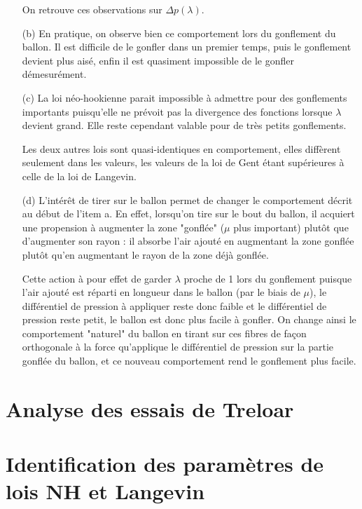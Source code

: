 \documentclass[a4paper,11pt]{article}
\begin{document}
\begin{enumerate}
On retrouve ces observations sur $\Delta p (\lambda)$.

\item[(b)]
En pratique, on observe bien ce comportement lors du gonflement du ballon. Il est difficile de le gonfler dans un premier temps, puis le gonflement devient plus aisé, enfin il est quasiment impossible de le gonfler démesurément.

\item[(c)]
La loi néo-hookienne parait impossible à admettre pour des gonflements importants puisqu'elle ne prévoit pas la divergence des fonctions lorsque $\lambda$ devient grand. Elle reste cependant valable pour de très petits gonflements.

\hspace{0.8cm}Les deux autres lois sont quasi-identiques en comportement, elles diffèrent seulement dans les valeurs, les valeurs de la loi de Gent étant supérieures à celle de la loi de Langevin.

\item[(d)]
L'intérêt de tirer sur le ballon permet de changer le comportement décrit au début de l'item a. En effet, lorsqu'on tire sur le bout du ballon, il acquiert une propension à augmenter la zone "gonflée" ($\mu$ plus important) plutôt que d'augmenter son rayon : il absorbe l'air ajouté en augmentant la zone gonflée plutôt qu'en augmentant le rayon de la zone déjà gonflée.

\hspace{0.8cm}Cette action à pour effet de garder $\lambda$ proche de 1 lors du gonflement puisque l'air ajouté est réparti en longueur dans le ballon (par le biais de $\mu$), le différentiel de pression à appliquer reste donc faible et le différentiel de pression reste petit, le ballon est donc plus facile à gonfler. On change ainsi le comportement "naturel" du ballon en tirant sur ces fibres de façon orthogonale à la force qu'applique le différentiel de pression sur la partie gonflée du ballon, et ce nouveau comportement rend le gonflement plus facile.
\end{enumerate}

\section{Analyse des essais de Treloar}




\section{Identification des paramètres de lois NH et Langevin}
\end{document}
